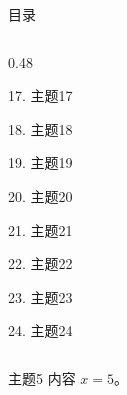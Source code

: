 \documentclass[aspectratio=169,10pt,fontset=fandol]{ctexbeamer}
\begin{document}
\begin{frame}[t,fragile]{目录}
\begin{columns}[T,onlytextwidth]
\begin{column}{0.48\textwidth}
{\color{gray!40}\small 17. 主题17\par}\vspace{0.22em}
{\color{gray!40}\small 18. 主题18\par}\vspace{0.22em}
{\color{gray!40}\small 19. 主题19\par}\vspace{0.22em}
{\color{gray!40}\small 20. 主题20\par}\vspace{0.22em}
{\color{gray!40}\small 21. 主题21\par}\vspace{0.22em}
{\color{gray!40}\small 22. 主题22\par}\vspace{0.22em}
{\color{gray!40}\small 23. 主题23\par}\vspace{0.22em}
{\color{gray!40}\small 24. 主题24\par}\vspace{0.22em}
\end{column}
\end{columns}
\end{frame}
\begin{frame}[t,fragile]{主题5}
\normalsize
{\normalsize
内容 $x=5$。
}
\end{frame}
\end{document}
